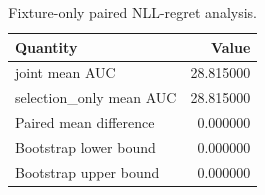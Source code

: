 \begin{table}[ht]
\centering
\caption{Fixture-only paired NLL-regret analysis.}
\begin{tabular}{lr}
\hline
Quantity & Value \\
\hline
joint mean AUC & 28.815000 \\
selection\_only mean AUC & 28.815000 \\
Paired mean difference & 0.000000 \\
Bootstrap lower bound & 0.000000 \\
Bootstrap upper bound & 0.000000 \\
\hline
\end{tabular}
\end{table}
